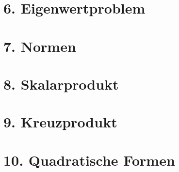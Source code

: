 \documentclass[8pt, a4paper, landscape, xcolor=dvipsnames]{extarticle}
\begin{document}
\begin{multicols*}{4}
\section{6. Eigenwertproblem}
\WhiteSpace
	
	
	
	
	
	
	

\section{7. Normen}
\WhiteSpace
	
	
	
	
	
\section{8. Skalarprodukt}
\WhiteSpace
	
	
	
	
	
\section{9. Kreuzprodukt}
\WhiteSpace
	
	
	
	
\section{10. Quadratische Formen}
\WhiteSpace
	
	
	
	
	
	
	
	
	

\end{multicols*}
\end{document}
